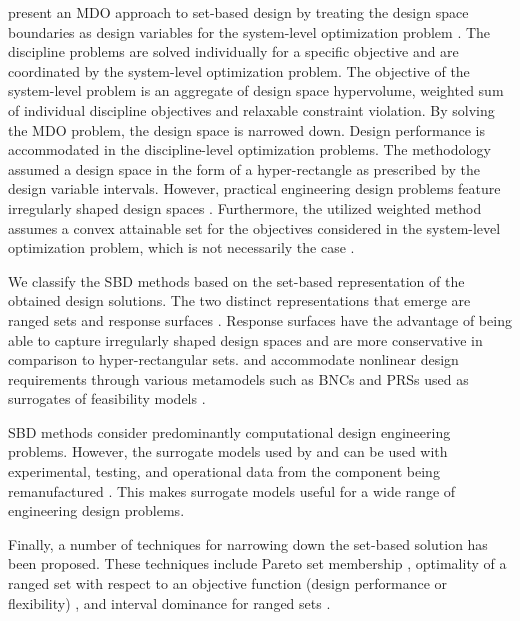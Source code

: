 \citeauthor{Hannapel2014} present an \ac{MDO} approach to set-based design by treating the design space boundaries as design variables for the system-level optimization problem \cite{Hannapel2014}. The discipline problems are solved individually for a specific objective and are coordinated by the system-level optimization problem. The objective of the system-level problem is an aggregate of design space hypervolume, weighted sum of individual discipline objectives and relaxable constraint violation. By solving the \ac{MDO} problem, the design space is narrowed down. Design performance is accommodated in the discipline-level optimization problems. The methodology assumed a design space in the form of a hyper-rectangle as prescribed by the design variable intervals. However, practical engineering design problems feature irregularly shaped design spaces \cite{Shahan2012}. Furthermore, the utilized weighted method assumes a convex attainable set for the objectives considered in the system-level optimization problem, which is not necessarily the case \cite{WardAthan1996}.

We classify the \ac{SBD} methods based on the set-based representation of the obtained design solutions. The two distinct representations that emerge are ranged sets \cite{Qureshi2014,Nahm2005,Olewnik2004,Liu2008,Suh2007} and response surfaces \cite{Kizer2014,Shahan2012,Yannou2003,Ge2005}. Response surfaces have the advantage of being able to capture irregularly shaped design spaces and are more conservative in comparison to hyper-rectangular sets. \citeauthor{Shahan2012} and \citeauthor{Yannou2003} accommodate nonlinear design requirements through various metamodels such as \acp{BNC} and \acp{PRS} used as surrogates of feasibility models \cite{Shahan2012,Yannou2003}.

\ac{SBD} methods consider predominantly computational design engineering problems. However, the surrogate models used by \citeauthor{Shahan2012} and \citeauthor{Yannou2003} can be used with experimental, testing, and operational data from the component being remanufactured \cite{Shahan2012,Yannou2003}. This makes surrogate models useful for a wide range of engineering design problems.

Finally, a number of techniques for narrowing down the set-based solution has been proposed. These techniques include Pareto set membership \cite{Olewnik2004,Miller2018}, optimality of a ranged set with respect to an objective function (design performance or flexibility) \cite{Hannapel2014,Liu2008,Suh2007}, and interval dominance for ranged sets \cite{Malak2009,Miller2018}.

